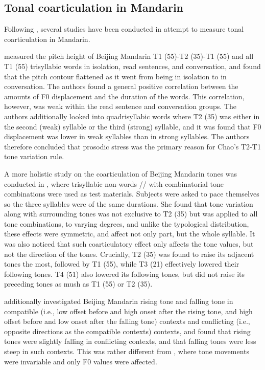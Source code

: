 \documentclass[12pt]{report}
\newcommand{\tip}{\textipa}
\begin{document}
\begin{CJK}{UTF8}{bsmi}
\section{Tonal coarticulation in Mandarin}\label{section:Tonal coarticulation in Mandarin}
Following \cite{Chao1968}, several studies have been conducted in attempt to measure tonal coarticulation in Mandarin.

\cite{ShihSproat1992} measured the pitch height of Beijing Mandarin T1 (55)-T2 (35)-T1 (55) and all T1 (55) trisyllabic words in isolation, read sentences, and conversation, and found that the pitch contour flattened as it went from being in isolation to in conversation. The authors found a general positive correlation between the amounts of F0 displacement and the duration of the words. This correlation, however, was weak within the read sentence and conversation groups. The authors additionally looked into quadrisyllabic words where T2 (35) was either in the second (weak) syllable or the third (strong) syllable, and it was found that F0 displacement was lower in weak syllables than in strong syllables. The authors therefore concluded that prosodic stress was the primary reason for Chao's T2-T1 tone variation rule.

A more holistic study on the coarticulation of Beijing Mandarin tones was conducted in \cite{Shen1990}, where trisyllabic non-words /\tip{pa.pa.pa}/ with combinatorial tone combinations were used as test materials. Subjects were asked to pace themselves so the three syllables were of the same durations.  She found that tone variation along with surrounding tones was not exclusive to T2 (35) but was applied to all tone combinations, to varying degrees, and unlike the typological distribution, these effects were symmetric, and affect not only part, but the whole syllable. It was also noticed that such coarticulatory effect only affects the tone values, but not the direction of the tones. Crucially, T2 (35) was found to raise its adjacent tones the most, followed by T1 (55), while T3 (21) effectively lowered their following tones. T4 (51) also lowered its following tones, but did not raise its preceding tones as mush as T1 (55) or T2 (35).

\cite{Xu1994} additionally investigated Beijing Mandarin rising tone and falling tone in compatible (i.e., low offset before and high onset after the rising tone, and high offset before and low onset after the falling tone) contexts and conflicting (i.e., opposite directions as the compatible contexts) contexts, and found that rising tones were slightly falling in conflicting contexts, and that falling tones were less steep in such contexts. This was rather different from \cite{Shen1990}, where tone movements were invariable and only F0 values were affected.


\end{CJK}
\end{document}

